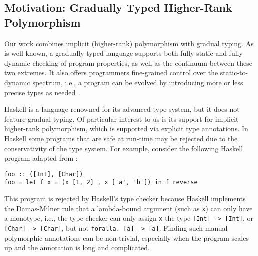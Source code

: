
\subsection{Motivation: Gradually Typed Higher-Rank Polymorphism}

Our work combines implicit (higher-rank) polymorphism with gradual typing. As
is well known, a gradually typed language supports both fully static and fully
dynamic checking of program properties, as well as the continuum between these
two extremes. It also offers programmers fine-grained control over the
static-to-dynamic spectrum, i.e., a program can be evolved by introducing more
or less precise types as needed~\citep{garcia2016abstracting}. 

Haskell is a language renowned for its advanced type system, but it does not feature
gradual typing. Of particular interest to us is its support for implicit
higher-rank polymorphism, which is supported via explicit type
annotations. 
In Haskell some programs that are safe at run-time may
be rejected due to the conservativity of the type system. For example, consider
the following Haskell program adapted from \citet{jones2007practical}:
\begin{lstlisting}
foo :: ([Int], [Char])
foo = let f x = (x [1, 2] , x ['a', 'b']) in f reverse
\end{lstlisting}
This program is rejected by Haskell's type checker because Haskell implements
the Damas-Milner \citep{hindley69principal, damas1982principal} rule that a
lambda-bound argument (such as \lstinline{x}) can only have a monotype, i.e.,
the type checker can only assign \lstinline{x} the type
\lstinline{[Int] -> [Int]}, or \lstinline{[Char] -> [Char]},
but not \lstinline$foralla. [a] -> [a]$.
Finding such manual polymorphic annotations can be non-trivial, especially
when the program scales up and the annotation is long and complicated.

